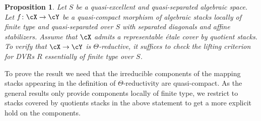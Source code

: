 \documentclass[a4paper]{amsart}
\numberwithin{equation}{section}
\theoremstyle{plain}
\newtheorem{prop}[thm]{Proposition}
\theoremstyle{definition}
\newcommand{\co}{\colon}
\begin{document}
\begin{prop} \label{P:theta-reductive-essentially-finite-type-DVRs}
{Let $S$ be a quasi-excellent and quasi-separated algebraic space.}
Let $f \co \cX \to \cY$ be a quasi-compact morphism of algebraic stacks locally of finite type and quasi-separated {over $S$ with separated diagonals} and affine stabilizers. Assume that $\cX$ admits a representable \'etale cover by quotient stacks.
		To verify that $\cX \to \cY$ is $\Theta$-reductive, it suffices to check the lifting criterion for DVRs $R$ essentially of finite type over $S$.
	\end{prop}

To prove the result we need that the irreducible components of the mapping stacks appearing in the definition of $\Theta$-reductivity are quasi-compact. As the general results only provide components locally of finite type, we restrict to stacks covered by quotients stacks in the above statement to get a more explicit hold on the components.
\end{document}
